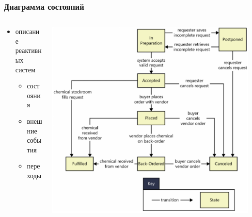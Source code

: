 \documentclass{../../slides-style}
\begin{document}
    \begin{frame}
        \frametitle{Диаграмма состояний}
        \begin{columns}
            \begin{column}{0.4\textwidth}
                \begin{itemize}
                    \item описание реактивных систем
                    \begin{itemize}
                        \item состояния
                        \item внешние события
                        \item переходы
                    \end{itemize}
                \end{itemize}
            \end{column}
            \begin{column}{0.6\textwidth}
                \strut
                \includegraphics[width=\textwidth]{stateDiagram.png}
            \end{column}
        \end{columns}
    \end{frame}
\end{document}
